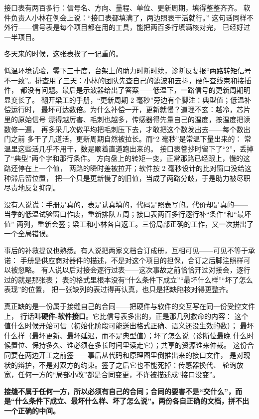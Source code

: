 接口表有两百多行：信号名、方向、量程、单位、更新周期，填得整整齐齐。
软件负责人小林在例会上说：“接口表都填满了，两边照表干活就行。”
这句话同样不外行——信号表是每个项目都在用的工具，能把两百多行填满核对完，
已经好过一半项目。

冬天来的时候，这张表挨了一记重的。

低温环境试验，零下三十度，台架上的助力时断时续，诊断反复报“两路转矩信号
不一致”。排查用了三天：小林的团队先查自己的滤波和去抖，硬件查线束和接插件，
都没有问题。最后是示波器给出了答案——低温下，一路信号的更新周期明显变长了。
翻开梁工的手册，“更新周期 2 毫秒”旁边有个脚注：典型值；低温补偿运行时，
最坏可达数倍。为什么补偿一开，更新就慢？道理不玄：越冷，芯片里的原始信号
漂得越厉害、毛刺也越多，传感器得先量自己的温度，按温度把读数修一遍，
再多采几次做平均把毛刺压下去，才敢把这个数发出去——每个数出门之前
多干了几道活，更新周期自然被拉长。而“2 毫秒”是常温下量出来的：
常温里这些活几乎不用干，数是顺着直道跑出来的。
接口表誊抄时留下了“2”，丢掉了“典型”两个字和那行条件。
方向盘上的转矩一变，正常那路已经跟上，慢的这路还停在上一个值，
两路的瞬时差被拉开；软件按 2 毫秒设计的比对窗口没给这种滞后留位置，
把一个只是更新慢了的旧值，当成了两路分歧，于是助力被尽职尽责地反复抑制。

没有人说谎：手册是真的，表是认真填的，代码是照表写的。代价却是真的——
当季的低温试验窗口作废，重新排队五周；接口表两百多行逐行补“条件”和“最坏值”
两列，重新会签；梁工和小林各自返工。三份局部正确的工作，又一次拼出了
一个全局错误。

事后的补救提议也熟悉。有人说把两家文档合订成册，互相可见——可见不等于承诺：
手册是供应商对器件的描述，不是对这个项目的担保，合订之后脚注照样可以被忽略。
有人说以后对接会逐行过表——这次事故之前恰恰开过对接会，逐行过的就是那张表；
表的格式里根本没有“什么条件下成立”“最坏什么样”“坏了怎么表现”的位置，
把一张缺列的表过得再认真，也只是把缺陷核对得更整齐。

真正缺的是一份属于接缝自己的合同——把硬件与软件的交互写在同一份受控文件上，
行话叫\textbf{硬件-软件接口}。它比信号表多出的，正是那几列救命的内容：
这个值什么时候开始可信（初始化阶段可能送出格式正确、语义还没生效的数）；
最坏什么样（最坏更新、最坏延迟，而不是典型值）；坏了怎么说（诊断位最晚
什么时候置位、保持多久、谁必须在多长时间里读走它）；共享的资源谁来仲裁。
这份合同要在两边开工之前签——事后从代码和原理图里倒推出来的接口文件，
是对现状的辩护，不是对双方的约束。签了之后它也不能死掉：传感器换代、
轮询放宽，任何一方的“局部小改”都是合同变更，不许被描述成“接口没变”。

\textbf{接缝不属于任何一方，所以必须有自己的合同；合同的要害不是“交什么”，而是“什么条件下成立、最坏什么样、坏了怎么说”。两份各自正确的文档，拼不出一个正确的中间。}

